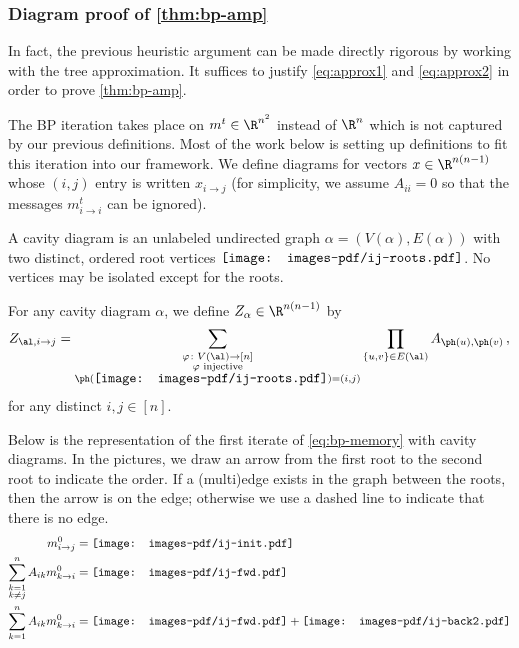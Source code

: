 \documentclass[12pt]{article}
\newcommand{\ijrootpic}{\vcenter{\hbox{\texttt{[image: images-pdf/ij-roots.pdf]}}}}
\newcommand{\smallijrootpic}{\vcenter{\hbox{\texttt{[image: images-pdf/ij-roots.pdf]}}}}
\begin{document}
\subsubsection{Diagram proof of \cref{thm:bp-amp}}
\label{sec:bp-amp-formal}

In fact, the previous heuristic argument can be
made directly rigorous by working with the tree
approximation. It suffices to justify
\cref{eq:approx1} and \cref{eq:approx2} 
in order to prove \cref{thm:bp-amp}.

The BP iteration takes place on $m^t \in \R^{n^2}$ instead of $\R^n$
which is not captured by our previous definitions.
Most of the work below is setting up definitions to fit this iteration into our framework.
We define diagrams
for vectors $x \in \R^{n(n-1)}$ whose $(i,j)$ entry is written $x_{i \to j}$
(for simplicity, we assume $A_{ii} = 0$ so that
the messages $m_{i \to i}^t$ can be ignored).

\begin{definition}
    A cavity diagram is an unlabeled undirected graph $\alpha=(V(\alpha),E(\alpha))$ with two distinct, ordered root vertices $\ijrootpic$. No vertices may be isolated except for the roots.

    For any cavity diagram $\alpha$, we define $Z_\alpha\in \R^{n(n-1)}$ by
    \[
        Z_{\al, i \to j} = \sum_{\substack{\varphi \colon V(\al) \to [n]\\\textnormal{$\varphi$ injective} \\ \ph(\smallijrootpic) = (i,j)}} \prod_{\{u, v\} \in E(\al)} A_{\ph(u),\ph(v)}\,,
    \]
    for any distinct $i,j\in [n]$.
\end{definition}


Below is the representation of the first iterate of \cref{eq:bp-memory} with cavity diagrams. In the pictures, we draw an arrow from the first root to the second root to indicate the order.
If a (multi)edge exists in the graph between the roots, then the arrow
is on the edge; otherwise we use a dashed line to indicate that there is no edge.
\begingroup
\allowdisplaybreaks
\begin{align*}
    m_{i \to j}^0 &= \vcenter{\hbox{\texttt{[image: images-pdf/ij-init.pdf]}}}\\
    \sum_{\substack{k = 1\\k \neq j}}^n A_{ik} m_{k \to i}^0 &= \vcenter{\hbox{\texttt{[image: images-pdf/ij-fwd.pdf]}}}\\
    \sum_{k = 1}^n A_{ik}m_{k \to i}^0 &= \vcenter{\hbox{\texttt{[image: images-pdf/ij-fwd.pdf]}}} + \vcenter{\hbox{\texttt{[image: images-pdf/ij-back2.pdf]}}}
\end{align*}
\end{document}
